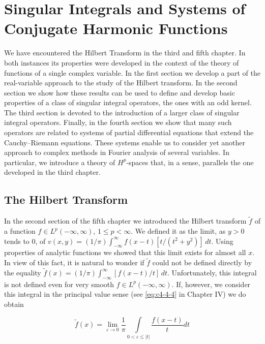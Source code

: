 \chapter{Singular Integrals and Systems of Conjugate Harmonic Functions}
\label{ch:c6}

We have encountered the Hilbert Transform in the third and fifth chapter. In both instances its properties were developed in the context of the theory of functions of a single complex variable. In the first section we develop a part of the real-variable approach to the study of the Hilbert transform. In the second section we show how these results can be used to define and develop basic properties of a class of singular integral operators, the ones with an odd kernel. The third section is devoted to the introduction of a larger class of singular integral operators. Finally, in the fourth section we show that many such operators are related to systems of partial differential equations that extend the Cauchy--Riemann equations. These systems enable us to consider yet another approach to complex methods in Fourier analysis of several variables. In particular, we introduce a theory of $H^{p}$-spaces that, in a sense, parallels the one developed in the third chapter.

\section{The Hilbert Transform}

In the second section of the fifth chapter we introduced the Hilbert transform $\tilde{f}$ of a function $f \in L^p(-\infty, \infty)$, $1 \leq p < \infty$. We defined it as the limit, as $y > 0$ tends to 0, of $v(x, y) = (1/\pi)\int_{-\infty}^{\infty} f(x - t)[t/(t^2 + y^2)]\,dt$. Using properties of analytic functions we showed that this limit exists for almost all $x$. In view of this fact, it is natural to wonder if $\tilde{f}$ could not be defined directly by the equality $\tilde{f}(x) = (1/\pi)\int_{-\infty}^{\infty} [f(x - t)/t]\,dt$. Unfortunately, this integral is not defined even for very smooth $f \in L^p(-\infty, \infty)$. If, however, we consider this integral in the principal value sense (see \eqref{eq:c4-4-4} in Chapter IV) we do obtain

\begin{equation}\label{eq:c6-1-1}
\tilde{f}(x)=\lim_{\varepsilon\to0}\frac{1}{\pi}\int\limits_{0<\varepsilon\leq|t|}\frac{f(x-t)}{t}dt
\end{equation}

